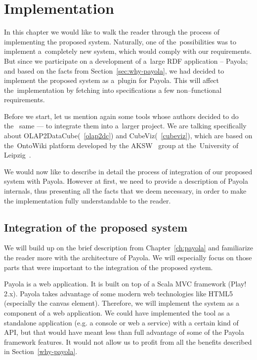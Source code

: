 \chapter{Implementation}
\label{ch:implementation}
In this chapter we would like to walk the reader through the process of implementing 
the proposed system. Naturally, one of the~possibilities was to implement a~completely new system, 
which would comply with our requirements. But since we participate on a development of a~large RDF
application -- Payola; and based on the facts from
Section~\ref{sec:why-payola}, we had decided to implement the proposed system as a~plugin
for Payola. This will affect the~implementation by fetching into specifications a few non--functional
requirements.

Before we start, let us mention again some tools whose authors decided to do the~
same --- to integrate them into a~larger project. We are talking specifically about 
OLAP2DataCube(~\ref{olap2dc}) and CubeViz(~\ref{cubeviz}),
which are based on the~OntoWiki platform developed by 
the AKSW~\cite{aksw} group at the~University of Leipzig~\cite{leipzich-uni}.

We would now like to describe in detail the process of integration of our proposed system with
Payola. However at first, we need to provide a description of Payola internals, thus presenting all
the facts that we deem necessary, in order to make the implementation fully understandable to
the reader.

\section{Integration of the proposed system}
We will build up on the brief description from Chapter~\ref{ch:payola} and familiarize the reader
more with the architecture of Payola. We will especially
focus on those parts that were important to the integration of the proposed system.

Payola is a web application. It is built on top of a Scala MVC framework (Play! 2.x).
Payola takes advantage of
some modern web technologies like HTML5 (especially the canvas element).
Therefore, we will implement the system as a component of a web application.
We could have implemented the tool as a standalone 
application (e.g. a console or web a service) with a certain kind of API,
but that would have meant less than full advantage of some of the Payola framework features.
It would not allow us to profit from all the benefits described in Section~\ref{why-payola}. 

